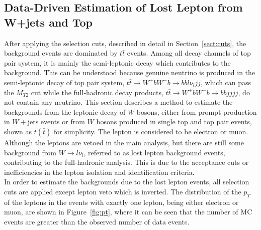 \subsection{Data-Driven Estimation of Lost Lepton from W+jets and Top}
\label{sect:intro}
After applying the selection cuts, described in detail in Section~\ref{sect:cuts}, the background 
events are dominated by $t\bar t$ events. Among all decay channels of top pair system, 
it is mainly the semi-leptonic decay which contributes to the background. 
This can be understood because genuine neutrino is produced in the semi-leptonic decay of 
top pair system, $t\bar t\rightarrow W^+bW^-\bar b\rightarrow b\bar bl\nu_ljj$, 
which can pass the $M_{T2}$ cut while the full-hadronic decay products, $t\bar t\rightarrow W^+bW^-\bar b\rightarrow b\bar bjjjj$, do not contain any neutrino.
This section describes a method to estimate the backgrounds from the leptonic decay of $W$ bosons, 
either from prompt production in $W+$jets events or from $W$ bosons produced in single top and 
top pair events, shown as $t(\bar t)$ for simplicity. The lepton is considered to be electron or muon.\\
Although the leptons are vetoed in the main analysis, but there are still some background 
from $W\rightarrow l\nu_l$, referred to as lost lepton background events, 
contributing to the full-hadronic analysis. This is due to the acceptance cuts or 
inefficiencies in the lepton isolation and identification criteria.\\
In order to estimate the backgrounds due to the lost lepton events, all selection cuts are applied except
 lepton veto which is inverted. The distribution of the $p_T$ of the leptons in the events 
with exactly one lepton, being either electron or muon, are shown in 
Figure~\ref{fig:pt}, where it can be seen that the number of MC events are greater than the 
observed number of data events.\\

